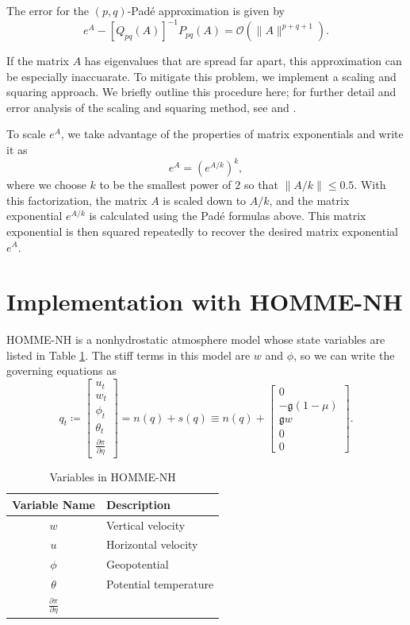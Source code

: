 \documentclass{csri19}
\newcommand{\CFKg}{\mathfrak{g}}
\begin{document}
The error for the $(p,q)$-Pad\'e approximation is given by
\[ e^A - \left[Q_{pq}(A)\right]^{-1}P_{pq}(A) = \mathcal{O}(\|A\|^{p+q+1}).\]

If the matrix $A$ has eigenvalues that are spread far apart, this 
approximation can be especially inaccuarate. To mitigate this problem, we 
implement a scaling and squaring approach. We briefly outline this 
procedure here; for further detail and error analysis of the scaling and 
squaring method, see \cite{CFK:higham2005} and \cite{CFK:Al-Mohy2009}. 

To scale $e^A$, we take advantage of the properties of matrix exponentials 
and write it as
\[e^{A} = \left(e^{A/k}\right)^k,\]
where we choose $k$ to be the smallest power of $2$ so that 
$\|A/k\| \leq 0.5$. With this factorization, the matrix $A$ is scaled down
 to $A/k$, and the matrix exponential $e^{A/k}$ is calculated using the 
Pad\'e formulas above. This matrix exponential is then squared repeatedly to 
recover the desired matrix exponential $e^{A}$.

\section{Implementation with HOMME-NH}\label{CFK:sec:homme}
HOMME-NH is a nonhydrostatic atmosphere model whose state variables are
listed in Table \ref{CFK:tab:variables}. The stiff terms in this model are 
$w$ and $\phi$, so we can write the governing equations as
\[q_t \coloneqq \begin{bmatrix} u_t \\
w_t\\
\phi_t\\
\theta_t\\
\frac{\partial \pi}{\partial \eta}
\end{bmatrix} = n(q) + s(q) \equiv n(q) + \begin{bmatrix}
0\\
-\CFKg (1-\mu)\\
\CFKg w\\
0\\
0\end{bmatrix}.\] 

\begin{table}[ht]
  \caption{Variables in HOMME-NH}
  \label{CFK:tab:variables}
  \begin{center}
    \begin{tabular}{|c|l|}
      \hline
      \textbf{Variable Name} & \textbf{Description} \\
      \hline
      $w$                                & Vertical velocity      \\
      $u$                                & Horizontal velocity    \\
      $\phi$                             & Geopotential           \\
      $\theta$                           & Potential temperature  \\
      $\frac{\partial\pi}{\partial\eta}$ &                        \\
      \hline
    \end{tabular}
  \end{center}
\end{table}
\end{document}
